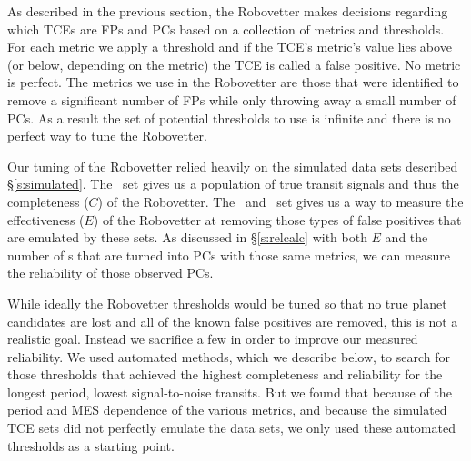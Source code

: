 \label{s:optimize}
As described in the previous section, the Robovetter makes decisions regarding which TCEs are FPs and PCs based on a collection of metrics and thresholds.  For each metric we apply a threshold and if the TCE's metric's value lies above (or below, depending on the metric) the TCE is called a false positive.  No metric is perfect. The metrics we use in the Robovetter are those that were identified to remove a significant number of FPs while only throwing away a small number of PCs.  As a result the set of potential thresholds to use is infinite and there is no perfect way to tune the Robovetter.

Our tuning of the Robovetter relied heavily on the simulated data sets described \S\ref{s:simulated}. The \injtce\ set gives us a population of true transit signals and thus the completeness ($C$) of the Robovetter.  The \scrtce\ and \invtce\ set gives us a way to measure the effectiveness ($E$) of the Robovetter at removing those types of false positives that are emulated by these sets. As discussed in \S\ref{s:relcalc} with both $E$ and the number of \opstce s that are turned into PCs with those same metrics, we can measure the reliability of those observed PCs.  

While ideally the Robovetter thresholds would be tuned so that no true planet candidates are lost and all of the known false positives are removed, this is not a realistic goal.  Instead we sacrifice a few  in order to improve our measured reliability. We used automated methods, which we describe below, to search for those thresholds that achieved the highest completeness and reliability for the longest period, lowest signal-to-noise transits. But we found that because of the period and MES dependence of the various metrics, and because the simulated TCE sets did not perfectly emulate the data sets, we only used these automated thresholds as a starting point.



